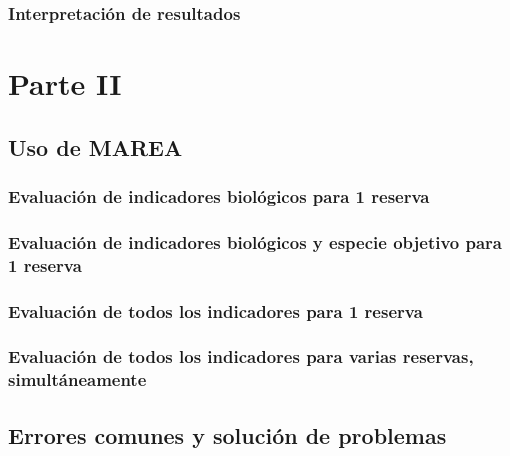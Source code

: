 \documentclass[]{krantz}
\begin{document}
\hypertarget{interpretacion-de-resultados}{%
\section{Interpretación de
resultados}\label{interpretacion-de-resultados}}

\hypertarget{part-parte-ii}{%
\part{Parte II}\label{part-parte-ii}}

\hypertarget{uso-de-marea}{%
\chapter{Uso de MAREA}\label{uso-de-marea}}

\hypertarget{evaluacion-de-indicadores-biologicos-para-1-reserva}{%
\section{Evaluación de indicadores biológicos para 1
reserva}\label{evaluacion-de-indicadores-biologicos-para-1-reserva}}

\hypertarget{evaluacion-de-indicadores-biologicos-y-especie-objetivo-para-1-reserva}{%
\section{Evaluación de indicadores biológicos y especie objetivo para 1
reserva}\label{evaluacion-de-indicadores-biologicos-y-especie-objetivo-para-1-reserva}}

\hypertarget{evaluacion-de-todos-los-indicadores-para-1-reserva}{%
\section{Evaluación de todos los indicadores para 1
reserva}\label{evaluacion-de-todos-los-indicadores-para-1-reserva}}

\hypertarget{evaluacion-de-todos-los-indicadores-para-varias-reservas-simultaneamente}{%
\section{Evaluación de todos los indicadores para varias reservas,
simultáneamente}\label{evaluacion-de-todos-los-indicadores-para-varias-reservas-simultaneamente}}

\hypertarget{errores-comunes-y-solucion-de-problemas}{%
\chapter{Errores comunes y solución de
problemas}\label{errores-comunes-y-solucion-de-problemas}}
\end{document}
